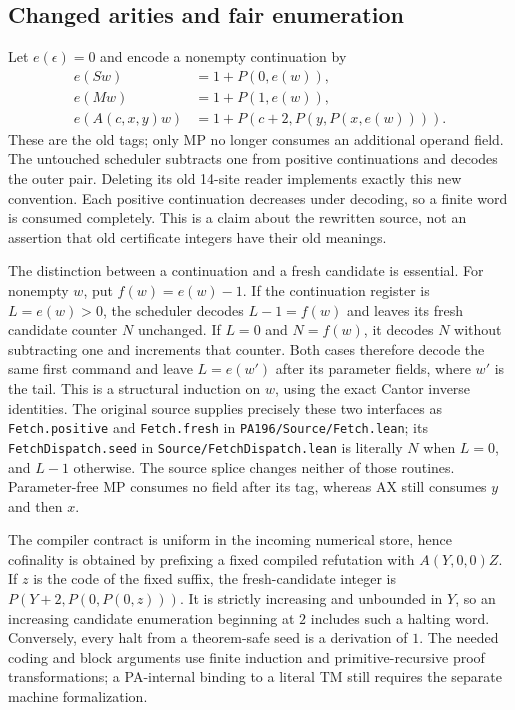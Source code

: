 \subsection{Changed arities and fair enumeration}

Let $e(\epsilon)=0$ and encode a nonempty continuation by
\begin{align*}
 e(Sw)&=1+P(0,e(w)),\\
 e(Mw)&=1+P(1,e(w)),\\
 e(A(c,x,y)w)&=1+P(c+2,P(y,P(x,e(w)))).
\end{align*}
These are the old tags; only MP no longer consumes an additional operand
field. The untouched scheduler subtracts one from positive continuations
and decodes the outer pair. Deleting its old 14-site reader implements
exactly this new convention. Each positive continuation decreases under
decoding, so a finite word is consumed completely. This is a claim about
the rewritten source, not an assertion that old certificate integers
have their old meanings.

The distinction between a continuation and a fresh candidate is essential.
For nonempty $w$, put $f(w)=e(w)-1$. If the continuation register is
$L=e(w)>0$, the scheduler decodes $L-1=f(w)$ and leaves its fresh
candidate counter $N$ unchanged. If $L=0$ and $N=f(w)$, it decodes $N$
without subtracting one and increments that counter. Both cases therefore
decode the same first command and leave $L=e(w')$ after its parameter
fields, where $w'$ is the tail. This is a structural induction on $w$,
using the exact Cantor inverse identities. The original source supplies
precisely these two interfaces as \texttt{Fetch.positive} and
\texttt{Fetch.fresh} in \texttt{PA196/Source/Fetch.lean}; its
\texttt{FetchDispatch.seed} in \texttt{Source/FetchDispatch.lean} is
literally $N$ when $L=0$, and $L-1$ otherwise. The source splice changes
neither of those routines. Parameter-free MP consumes no field after its
tag, whereas AX still consumes $y$ and then $x$.

The compiler contract is uniform in the incoming numerical store, hence
cofinality is obtained by prefixing a fixed compiled refutation with
$A(Y,0,0)Z$. If $z$ is the code of the fixed suffix, the fresh-candidate
integer is $P(Y+2,P(0,P(0,z)))$. It is strictly increasing and unbounded
in $Y$, so an increasing candidate enumeration beginning at $2$ includes
such a halting word. Conversely, every halt from a theorem-safe seed is
a derivation of $1$. The needed coding and block arguments use finite
induction and primitive-recursive proof transformations; a PA-internal
binding to a literal TM still requires the separate machine formalization.

